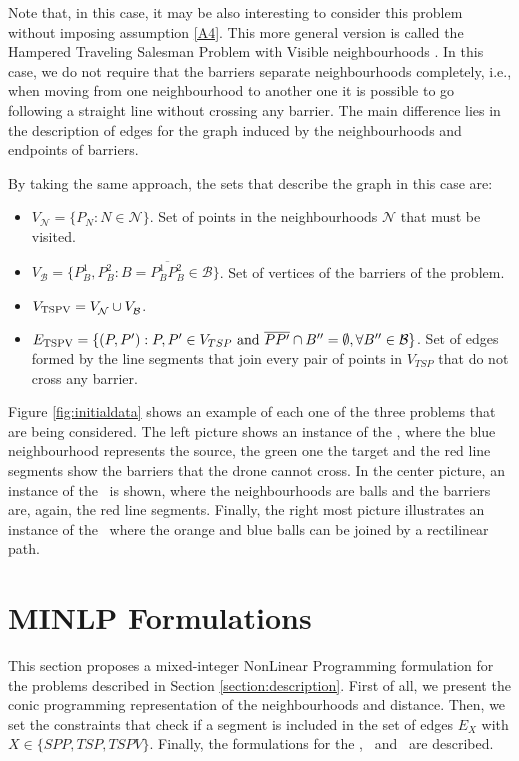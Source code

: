 \documentclass[a4paper,  review, authoryear, 1p.]{elsarticle}
\newcommand{\SPPN}{{\sf{H-SPPN}\xspace }}
\newcommand{\TSPN}{{\sf{H-TSPN}\xspace }}
\newcommand{\TSPVN}{{\sf{H-TSPVN}\xspace }}
\newcommand{\B}{{\mathcal B}}
\newcommand{\VB}{{V^{}_{\mathcal B}}}
\newcommand{\VN}{{V^{}_{\mathcal N}}}
\begin{document}
		Note that, in this case, it may be also interesting to consider this problem without imposing assumption \ref{A4}. This more general version is called the Hampered Traveling Salesman Problem with Visible neighbourhoods \TSPVN. In this case, we do not require that the barriers separate neighbourhoods completely, i.e., when moving from one neighbourhood to another one it is possible to go following a straight line without crossing any barrier. The main difference lies in the description of edges for the graph induced by the neighbourhoods and endpoints of barriers.
		
		By taking the same approach, the sets that describe the graph in this case are:
		
		\begin{itemize}
			\item $\VN=\{P_N:N\in\mathcal N\}$. Set of points in the neighbourhoods $\mathcal N$ that must be visited.
			\item $\VB=\{P^1_B, P^2_B:B=\overline{P^1_B P^2_B}\in \mathcal B\}$. Set of vertices of the barriers of the problem.
			\item $V_{\rm TSPV} = \VN \cup \VB$.
			\item $E_{\rm TSPV}=\{(P, P'):P, P' \in V_{TSP} \text{ and } \overline{PP'}\cap B''=\emptyset,\forall B''\in\B\}$. Set of edges formed by the line segments that join every pair of points in $V_{TSP}$ that do not cross any barrier.
		\end{itemize} 
		
		Figure \ref{fig:initialdata} shows an example of each one of the three problems that are being considered. The left picture shows an instance of the \SPPN, where the blue neighbourhood represents the source, the green one the target and the red line segments show the barriers that the drone cannot cross. In the center picture, an instance of the \TSPN \  is shown, where the neighbourhoods are balls and the barriers are, again, the red line segments. Finally, the right most picture illustrates an instance of the \TSPVN \ where the orange and blue balls can be joined by a rectilinear path.
		
		
		
		\section{MINLP Formulations}\label{section:formulations}
		
		This section proposes a mixed-integer NonLinear Programming formulation for the problems described in Section \ref{section:description}. First of all, we present the conic programming representation of the neighbourhoods and distance. Then,  we set the constraints that check if a segment is included in the set of edges $E_X$ with $X\in \{SPP, TSP, TSPV\}$. Finally, the formulations for the \SPPN, \TSPN \ and \TSPVN \ are described.
		
\end{document}
